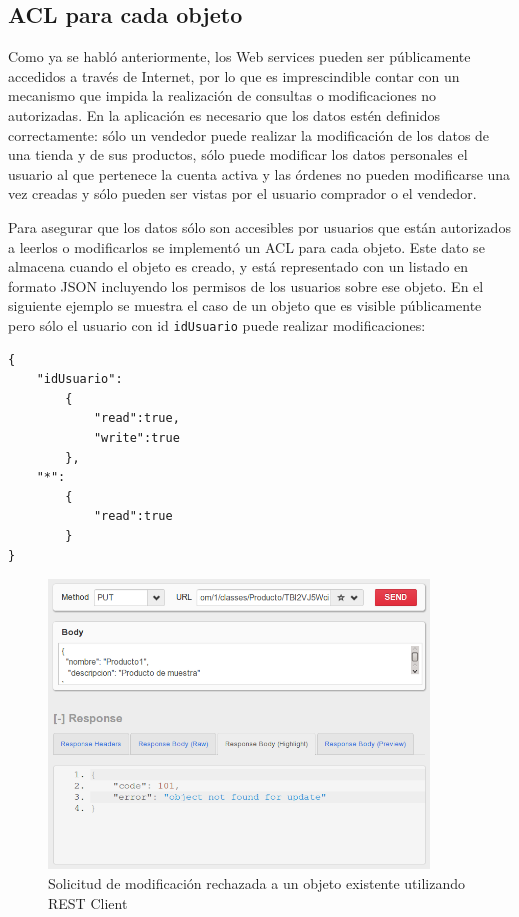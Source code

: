 \subsection{ACL para cada objeto}

Como ya se habló anteriormente, los Web services pueden ser públicamente accedidos a través de Internet, por lo que es imprescindible contar con un mecanismo que impida la realización de consultas o modificaciones no autorizadas. En la aplicación es necesario que los datos estén definidos correctamente: sólo un vendedor puede realizar la modificación de los datos de una tienda y de sus productos, sólo puede modificar los datos personales el usuario al que pertenece la cuenta activa y las órdenes no pueden modificarse una vez creadas y sólo pueden ser vistas por el usuario comprador o el vendedor.

Para asegurar que los datos sólo son accesibles por usuarios que están autorizados a leerlos o modificarlos se implementó un \gls{ACL} para cada objeto. Este dato se almacena cuando el objeto es creado, y está representado con un listado en formato \gls{JSON} incluyendo los permisos de los usuarios sobre ese objeto. En el siguiente ejemplo se muestra el caso de un objeto que es visible públicamente pero sólo el usuario con id \texttt{idUsuario} puede realizar modificaciones:

\begin{verbatim}
{
    "idUsuario":
        {
            "read":true,
            "write":true
        },
    "*":
        {
            "read":true
        }
}
\end{verbatim}

\begin{figure}[htbp]
  \centering
    \includegraphics[width=0.9\textwidth]{imagenes/implementacion/acl.png}
     \caption{Solicitud de modificación rechazada a un objeto existente utilizando REST Client}
    \label{fig:acl}
\end{figure}

